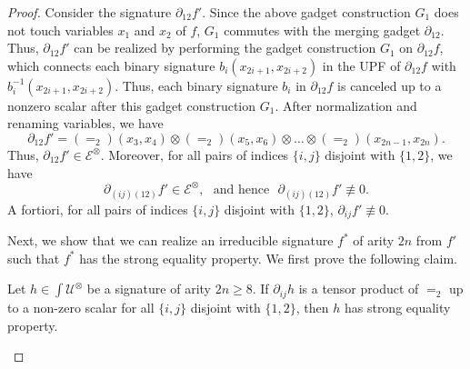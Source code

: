 \begin{proof}
Consider the signature ${\partial}_{12}{f'}$. 
Since the above gadget construction $G_1$  does not touch variables $x_1$ and $x_2$ of $f$, $G_1$
commutes with the merging gadget ${\partial}_{12}$. 
Thus, ${\partial}_{12}{f'}$ can be realized by performing the gadget construction $G_1$ on ${\partial}_{12}{f}$, which connects each binary signature ${b_{i}}(x_{2i+1}, x_{2i+2})$ in the UPF of ${\partial}_{12}{f}$ with  ${b^{-1}_{i}}(x_{2i+1}, x_{2i+2})$. 
Thus, each binary signature ${b_{i}}$ in ${\partial}_{12}{f}$ is canceled up to a nonzero scalar after this gadget construction $G_1$. 
After normalization and renaming variables, we have 
\begin{equation}\label{eqn:lm5-partial12-f}
{\partial}_{12}{f'}= (=_2)(x_3, x_4)\otimes (=_2)(x_5, x_6)\otimes \ldots \otimes (=_2)(x_{2n-1}, x_{2n}).
\end{equation}
Thus, ${\partial}_{12}{f'}\in {\mathcal{E}}^{\otimes}$.
Moreover, for all pairs of indices $\{i, j\}$ disjoint with $\{1, 2\}$,
we have 
\begin{equation}\label{equ-ij-12-in-D}
    {\partial}_{(ij)(12)}{f'}\in {\mathcal{E}}^{\otimes}, \text{ ~and hence~ } {\partial}_{(ij)(12)}{f'}\not\equiv 0.
    \end{equation}
A fortiori, for all pairs of indices $\{i, j\}$ disjoint with $\{1, 2\}$, ${\partial}_{ij}{f'}\not\equiv 0$.

Next, we show that we can realize an irreducible signature $f^\ast$ of arity $2n$ from ${f'}$ such that ${f^\ast}$ has the strong equality property.
We first prove the following claim.

\begin{claim}\label{claim: strong equality property}
    Let ${h}\in {\int}{{\mathcal{U}}}^{\otimes}$ be a signature of arity $2n\geqslant 8$. 
    If $\partial_{ij}{h}$ is a tensor product of $=_2$ up to a non-zero scalar for all $\{i, j\}$ disjoint with $\{1, 2\}$, then ${h}$ has strong equality property.
\end{claim}


\end{proof}
